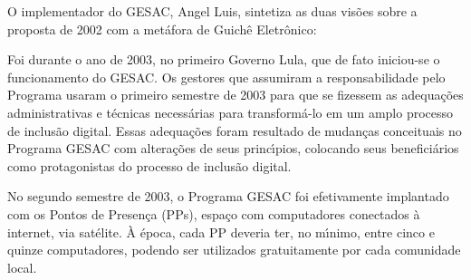 \documentclass[
12pt,		%
openright,	%
twoside,  %
a4paper,			%
chapter=TITLE,		%
english,			%
french,				%
spanish,			%
brazil				%
]{USPSC-classe/USPSC}
\begin{document}
O implementador do GESAC, Angel Luis, sintetiza as duas vis\~oes sobre a proposta de 2002 com a met\'afora de \textquotedbl Guich\^e Eletr\^onico\textquotedbl :


















\noindent\begin{center}\mbox{\centering{}}\end{center}


Foi durante o ano de 2003, no primeiro Governo Lula, que de fato iniciou-se o funcionamento do  GESAC. Os gestores que assumiram a responsabilidade pelo Programa usaram o primeiro semestre de 2003 para que se fizessem as adequa\c{c}\~oes administrativas e t\'ecnicas necess\'arias para transform\'a-lo em um amplo processo de inclus\~ao digital. Essas adequa\c{c}\~oes foram resultado de mudan\c{c}as conceituais no Programa GESAC com altera\c{c}\~oes de seus princ\'{\i}pios, colocando seus benefici\'arios como protagonistas do processo de inclus\~ao digital.

















No segundo semestre de 2003, o Programa GESAC foi efetivamente implantado com os Pontos de Presen\c{c}a (PPs), espa\c{c}o com  computadores conectados \`a internet, via sat\'elite. \`A \'epoca, cada PP deveria ter, no m\'{\i}nimo, entre cinco e quinze computadores, podendo ser utilizados gratuitamente por cada comunidade local.
\end{document}
